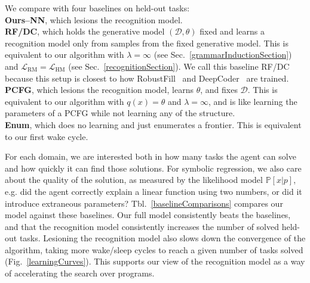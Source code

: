 \documentclass{article}
\newcommand{\probability}{\mathds{P}} %
\begin{document}
We compare  with four baselines on  held-out tasks:
\\\noindent \textbf{Ours--NN}, which lesions the recognition model.
\\\noindent \textbf{RF/DC}, which holds the generative model $(\mathcal{D},\theta)$ fixed and learns
a recognition model only from samples from the fixed generative model.
This is equivalent to our algorithm with $\lambda = \infty$ (see Sec.~\ref{grammarInductionSection})
and $\mathcal{L}_{\text{RM}} = \mathcal{L}_{\text{HM}}$ (see Sec.~\ref{recognitionSection}).
We call this baseline RF/DC because
this setup is closest to how RobustFill~\cite{devlin2017robustfill} and DeepCoder~\cite{balog2016deepcoder} are trained.
\\\noindent \textbf{PCFG}, which lesions the recognition model, learns $\theta$, and fixes $\mathcal{D}$.
This is equivalent to our algorithm with $q(x) = \theta$ and $\lambda = \infty$,
and is like learning the parameters of a PCFG while not learning any of the structure.
\\\noindent \textbf{Enum}, which does no learning and just enumerates a frontier.
This is equivalent to our first wake cycle.

For each domain,
we are interested both in how many tasks the
agent can solve and how quickly it can find those solutions.
For symbolic regression, we also care about the quality
of the solution, as measured by the likelihood model $\probability[x|p]$,
e.g. did the agent correctly explain a linear function
using two numbers, or did it introduce extraneous parameters?
Tbl.~\ref{baselineComparisons}
compares our model against these baselines.
Our full model consistently
beats the baselines,
and that the recognition model 
consistently increases the number of solved held-out tasks.
Lesioning the recognition model also slows down the convergence of the algorithm,
taking more wake/sleep cycles to reach a given number of tasks solved (Fig.~\ref{learningCurves}).
This supports our view of the recognition model as a way of accelerating the search over programs.
\end{document}
